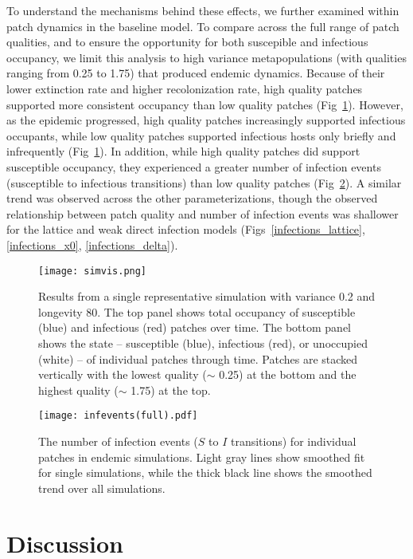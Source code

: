 \documentclass{svjour3}
\begin{document}
To understand the mechanisms behind these effects, we further examined within patch dynamics in the baseline model.  To compare across the full range of patch qualities, and to ensure the opportunity for both suscepible and infectious occupancy, we limit this analysis to high variance metapopulations (with qualities ranging from 0.25 to 1.75) that produced endemic dynamics.  Because of their lower extinction rate and higher recolonization rate, high quality patches supported more consistent occupancy than low quality patches (Fig~\ref{simvis}).  However, as the epidemic progressed, high quality patches increasingly supported infectious occupants, while low quality patches supported infectious hosts only briefly and infrequently (Fig~\ref{simvis}).  In addition, while high quality patches did support susceptible occupancy, they experienced a greater number of infection events (susceptible to infectious transitions) than low quality patches (Fig~\ref{infections}).  A similar trend was observed across the other parameterizations, though the observed relationship between patch quality and number of infection events was shallower for the lattice and weak direct infection models (Figs~\ref{infections_lattice}, \ref{infections_x0}, \ref{infections_delta}).

\begin{figure}
\centering
\texttt{[image: simvis.png]}
\caption{Results from a single representative simulation with variance 0.2 and longevity 80.  The top panel shows total occupancy of susceptible (blue) and infectious (red) patches over time.  The bottom panel shows the state -- susceptible (blue), infectious (red), or unoccupied (white) -- of individual patches through time.  Patches are stacked vertically with the lowest quality ($\sim$ 0.25) at the bottom and the highest quality ($\sim$ 1.75) at the top.}
\label{simvis}
\end{figure}


\begin{figure}
\centering
\texttt{[image: infevents(full).pdf]}
\caption{The number of infection events ($S$ to $I$ transitions) for individual patches in endemic simulations.  Light gray lines show smoothed fit for single simulations, while the thick black line shows the smoothed trend over all simulations.}
\label{infections}
\end{figure}


\section{Discussion}
\label{discussion} 
\end{document}
